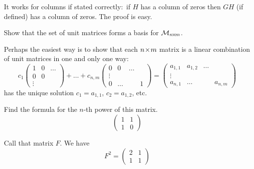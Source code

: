 \begin{exercises}
\begin{answer}
      It works for columns if stated correctly:~if \( H \) has a column of
      zeros then \( GH \) (if defined) has a column of zeros.
      The proof is easy.  
    \end{answer}
  \item 
    Show that the set of unit matrices forms a basis for 
    \( \mathcal{M}_{n \! \times \! m} \).
    \begin{answer}
      Perhaps the easiest way is to show that each \( n \! \times \! m \) matrix
      is a linear combination of unit matrices in one and only one way:
      \begin{equation*}
        c_1\begin{pmatrix}
             1  &0  &\ldots  \\
             0  &0           \\
             \vdots
           \end{pmatrix}
        +\dots+
        c_{n,m}\begin{pmatrix}
             0  &0      &\ldots  \\
             \vdots              \\
             0  &\ldots &       &1
           \end{pmatrix}
        =\begin{pmatrix}
           a_{1,1} &a_{1,2} &\ldots          \\
           \vdots                            \\
           a_{n,1} &\ldots  &      &a_{n,m} 
         \end{pmatrix}
      \end{equation*}
      has the unique solution \( c_1=a_{1,1} \), \( c_2=a_{1,2} \),
      etc.  
    \end{answer}
  \item  
    Find the formula for the $n$-th power of this matrix.
    \begin{equation*}
      \begin{pmatrix}
        1  &1  \\
        1  &0
      \end{pmatrix}
    \end{equation*}
    \begin{answer}
      Call that matrix \( F \).
      We have
      \begin{equation*}
        F^2=\begin{pmatrix}
          2  &1  \\
          1  &1
        \end{pmatrix}

\end{equation*}
\end{answer}
\end{exercises}

